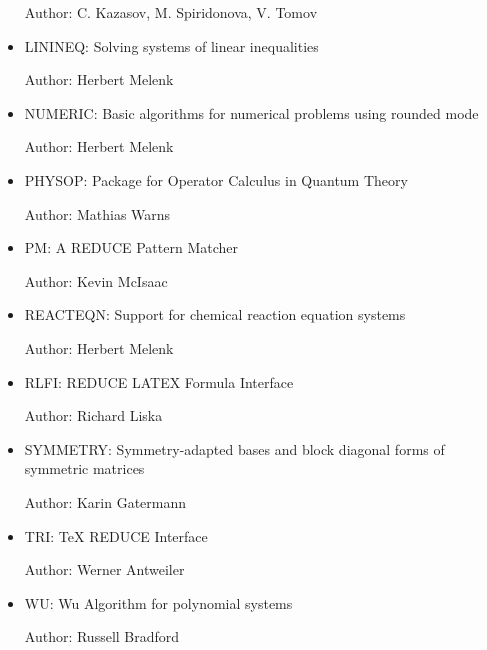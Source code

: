 \begin{itemize}
Author: C. Kazasov, M. Spiridonova, V. Tomov

\item{LININEQ: Solving systems of linear inequalities}

Author: Herbert Melenk

\item{NUMERIC: Basic algorithms for numerical problems using rounded mode}

Author: Herbert Melenk

\item{PHYSOP: Package for Operator Calculus in Quantum Theory}

Author: Mathias Warns

\item{PM: A REDUCE Pattern Matcher}

Author: Kevin McIsaac

\item{REACTEQN: Support for chemical reaction equation systems}

Author: Herbert Melenk

\item{RLFI: REDUCE LATEX Formula Interface}

Author: Richard Liska

\item{SYMMETRY: Symmetry-adapted bases and block diagonal forms
of symmetric matrices}

Author: Karin Gatermann

\item{TRI: TeX REDUCE Interface}

Author: Werner Antweiler

\item{WU: Wu Algorithm for polynomial systems}

Author: Russell Bradford

\end{itemize}


